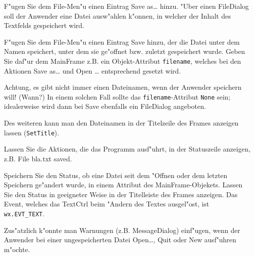 \begin{aufgabe}
\begin{teilaufgabe}
F"ugen Sie dem File-Men"u einen Eintrag \glqq Save as\dots\grqq{} hinzu. "Uber einen FileDialog soll der Anwender eine Datei ausw"ahlen k"onnen, in welcher der Inhalt des Textfelds gespeichert wird.
\end{teilaufgabe}

\begin{teilaufgabe}
F"ugen Sie dem File-Men"u einen Eintrag \glqq Save\grqq{} hinzu, der die Datei unter dem Namen speichert, unter dem sie ge"offnet bzw. zuletzt gespeichert wurde. Geben Sie daf"ur dem MainFrame z.B. ein Objekt-Attribut \lstinline{filename}, welches bei den Aktionen \glqq Save as\dots\grqq{} und \glqq Open \dots\grqq{} entsprechend gesetzt wird.

Achtung, es gibt nicht immer einen Dateinamen, wenn der Anwender speichern will! (Wann?) In einem solchen Fall sollte das \lstinline{filename}-Attribut \lstinline{None} sein; idealerweise wird dann bei \glqq Save\grqq{} ebenfalls ein FileDialog angeboten.

Des weiteren kann man den Dateinamen in der Titelzeile des Frames anzeigen lassen (\lstinline{SetTitle}).
\end{teilaufgabe}

\begin{teilaufgabe}
Lassen Sie die Aktionen, die das Programm ausf"uhrt, in der Statuszeile anzeigen, z.B. \glqq File bla.txt saved.\grqq
\end{teilaufgabe}

\begin{teilaufgabe}[Speicherstatus]
Speichern Sie den Status, ob eine Datei seit dem "Offnen oder dem letzten Speichern ge"andert wurde, in einem Attribut des MainFrame-Objekets. Lassen Sie den Status in geeigneter Weise in der Titelleiste des Frames anzeigen. Das Event, welches das TextCtrl beim "Andern des Textes ausgel"ost, ist \lstinline{wx.EVT_TEXT}.

Zus"atzlich k"onnte man Warnungen (z.B. MessageDialog) einf"ugen, wenn der Anwender bei einer ungespeicherten Datei \glqq Open\dots\grqq, \glqq Quit\grqq{} oder \glqq New\grqq{} ausf"uhren m"ochte.
\end{teilaufgabe}

\end{aufgabe}

